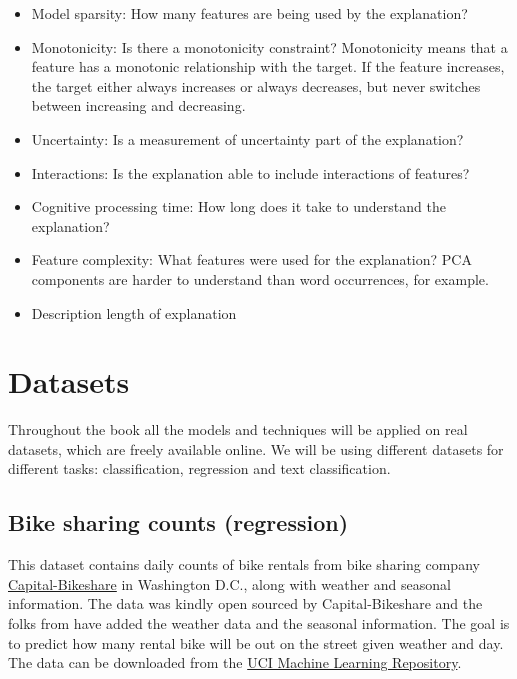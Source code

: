 \documentclass[12pt,]{krantz}
\providecommand{\tightlist}{%
  \setlength{\itemsep}{0pt}\setlength{\parskip}{0pt}}
\theoremstyle{definition}
\theoremstyle{definition}
\theoremstyle{definition}
\theoremstyle{remark}
\begin{document}
\begin{itemize}
\tightlist
\item
  Model sparsity: How many features are being used by the explanation?
\item
  Monotonicity: Is there a monotonicity constraint? Monotonicity means
  that a feature has a monotonic relationship with the target. If the
  feature increases, the target either always increases or always
  decreases, but never switches between increasing and decreasing.
\item
  Uncertainty: Is a measurement of uncertainty part of the explanation?
\item
  Interactions: Is the explanation able to include interactions of
  features?
\item
  Cognitive processing time: How long does it take to understand the
  explanation?
\item
  Feature complexity: What features were used for the explanation? PCA
  components are harder to understand than word occurrences, for
  example.
\item
  Description length of explanation
\end{itemize}

\chapter{Datasets}\label{data}

Throughout the book all the models and techniques will be applied on
real datasets, which are freely available online. We will be using
different datasets for different tasks: classification, regression and
text classification.

\section{Bike sharing counts (regression)}\label{bike-data}

This dataset contains daily counts of bike rentals from bike sharing
company \href{https://www.capitalbikeshare.com/}{Capital-Bikeshare} in
Washington D.C., along with weather and seasonal information. The data
was kindly open sourced by Capital-Bikeshare and the folks from
\citet{bike2013} have added the weather data and the seasonal
information. The goal is to predict how many rental bike will be out on
the street given weather and day. The data can be downloaded from the
\href{http://archive.ics.uci.edu/ml/datasets/Bike+Sharing+Dataset}{UCI
Machine Learning Repository}.
\end{document}
